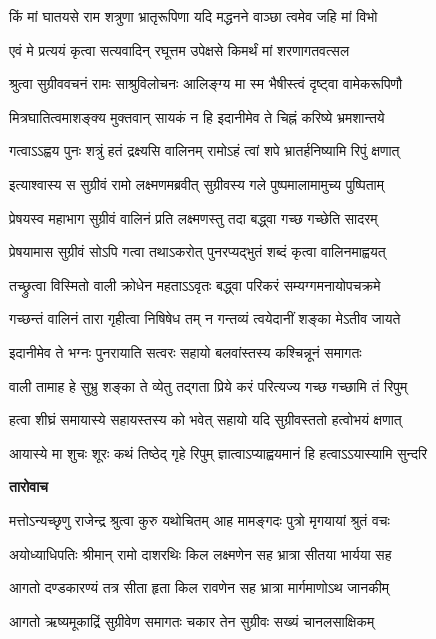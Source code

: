 \twolineshloka
{किं मां घातयसे राम शत्रुणा भ्रातृरूपिणा}
{यदि मद्धनने वाञ्छा त्वमेव जहि मां विभो} %

\twolineshloka
{एवं मे प्रत्ययं कृत्वा सत्यवादिन् रघूत्तम}
{उपेक्षसे किमर्थं मां शरणागतवत्सल} %

\twolineshloka
{श्रुत्वा सुग्रीववचनं रामः साश्रुविलोचनः}
{आलिङ्ग्य मा स्म भैषीस्त्वं दृष्ट्वा वामेकरूपिणौ} %

\twolineshloka
{मित्रघातित्वमाशङ्क्य मुक्तवान् सायकं न हि}
{इदानीमेव ते चिह्नं करिष्ये भ्रमशान्तये} %

\twolineshloka
{गत्वाऽऽह्वय पुनः शत्रुं हतं द्रक्ष्यसि वालिनम्}
{रामोऽहं त्वां शपे भ्रातर्हनिष्यामि रिपुं क्षणात्} %

\twolineshloka
{इत्याश्वास्य स सुग्रीवं रामो लक्ष्मणमब्रवीत्}
{सुग्रीवस्य गले पुष्पमालामामुच्य पुष्पिताम्} %

\twolineshloka
{प्रेषयस्व महाभाग सुग्रीवं वालिनं प्रति}
{लक्ष्मणस्तु तदा बद्ध्वा गच्छ गच्छेति सादरम्} %

\twolineshloka
{प्रेषयामास सुग्रीवं सोऽपि गत्वा तथाऽकरोत्}
{पुनरप्यद्भुतं शब्दं कृत्वा वालिनमाह्वयत्} %

\twolineshloka
{तच्छ्रुत्वा विस्मितो वाली क्रोधेन महताऽऽवृतः}
{बद्ध्वा परिकरं सम्यग्गमनायोपचक्रमे} %

\twolineshloka
{गच्छन्तं वालिनं तारा गृहीत्वा निषिषेध तम्}
{न गन्तव्यं त्वयेदानीं शङ्का मेऽतीव जायते} %

\twolineshloka
{इदानीमेव ते भग्नः पुनरायाति सत्वरः}
{सहायो बलवांस्तस्य कश्चिन्नूनं समागतः} %

\twolineshloka
{वाली तामाह हे सुभ्रु शङ्का ते व्येतु तद्गता}
{प्रिये करं परित्यज्य गच्छ गच्छामि तं रिपुम्} %

\twolineshloka
{हत्वा शीघ्रं समायास्ये सहायस्तस्य को भवेत्}
{सहायो यदि सुग्रीवस्ततो हत्वोभयं क्षणात्} %

\twolineshloka
{आयास्ये मा शुचः शूरः कथं तिष्ठेद् गृहे रिपुम्}
{ज्ञात्वाऽप्याह्वयमानं हि हत्वाऽऽयास्यामि सुन्दरि} %

\textbf{तारोवाच}

\twolineshloka
{मत्तोऽन्यच्छृणु राजेन्द्र श्रुत्वा कुरु यथोचितम्}
{आह मामङ्गदः पुत्रो मृगयायां श्रुतं वचः} %

\twolineshloka
{अयोध्याधिपतिः श्रीमान् रामो दाशरथिः किल}
{लक्ष्मणेन सह भ्रात्रा सीतया भार्यया सह} %

\twolineshloka
{आगतो दण्डकारण्यं तत्र सीता हृता किल}
{रावणेन सह भ्रात्रा मार्गमाणोऽथ जानकीम्} %

\twolineshloka
{आगतो ऋष्यमूकाद्रिं सुग्रीवेण समागतः}
{चकार तेन सुग्रीवः सख्यं चानलसाक्षिकम्} %

